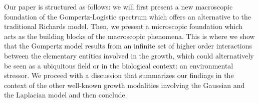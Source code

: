 \documentclass{article}
\begin{document}
Our paper is structured as follows: we will first present a new macroscopic foundation of the Gompertz-Logistic spectrum which offers an alternative to the traditional Richards model. Then, we present a microscopic foundation which acts as the building blocks of the macroscopic phenomena. This is where we show that the Gompertz model results from an infinite set of higher order interactions between the elementary entities involved in the growth, which could alternatively be seen as a ubiquitous field or in the biological context: an environmental stressor. We proceed with a discussion that summarizes our findings in the context of the other well-known growth modalities involving the Gaussian and the Laplacian model and then conclude.



  
\end{document}
